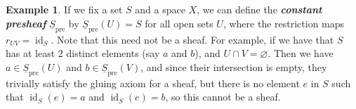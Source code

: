 \documentclass[psamsfonts]{amsart}
\theoremstyle{definition}
\newtheorem{exmp}[thm]{Example}
\theoremstyle{remark}
\renewcommand{\emptyset}{\varnothing}
\newcommand{\ib}[1]{\textbf{\textit{#1}}}
\DeclareMathOperator{\id}{id}
\begin{document}
%
\begin{exmp}
If we fix a set $S$ and a space $X$, we can define the \ib{constant presheaf} $\underline{S}_{\text{pre}}$ by $\underline{S}_{\text{pre}}(U) = S$ for all open sets $U$, where the restriction maps $r_{UV} = \id_S$. Note that this need not be a sheaf. For example, if we have that $S$ has at least $2$ distinct elements (say $a$ and $b$), and $U \cap V = \emptyset$. Then we have $a \in \underline{S}_{\text{pre}}(U)$ and $b \in \underline{S}_{\text{pre}}(V)$, and since their intersection is empty, they trivially satisfy the gluing axiom for a sheaf, but there is no element $e$ in $S$ such that $\id_S(e) = a$ and $\id_S(e) = b$, so this cannot be a sheaf.
\end{exmp}
%
\end{document}
